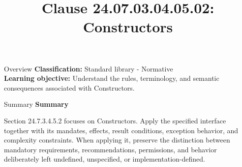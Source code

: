 \documentclass[10pt,letterpaper]{article}
\title{Clause 24.07.03.04.05.02: Constructors}
\author{}
\date{}
\begin{document}
\maketitle
\begin{CornellOverviewBox}{Overview}
\textbf{Classification:} Standard library - Normative\\[2pt]
\textbf{Learning objective:} Understand the rules, terminology, and semantic consequences associated with Constructors.
\end{CornellOverviewBox}\begin{CornellSummaryBox}{Summary}
{\sffamily\bfseries\color{Accent} Summary}\par\vspace{3pt}Section 24.7.3.4.5.2 focuses on Constructors. Apply the specified interface together with its mandates, effects, result conditions, exception behavior, and complexity constraints. When applying it, preserve the distinction between mandatory requirements, recommendations, permissions, and behavior deliberately left undefined, unspecified, or implementation-defined.
\end{CornellSummaryBox}
\end{document}
